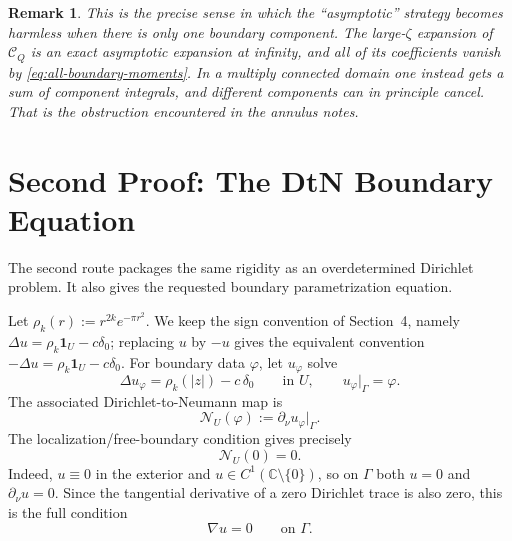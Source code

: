 \documentclass[11pt]{article}
\newtheorem{remark}[theorem]{Remark}
\newcommand{\C}{\mathbb C}
\newcommand{\1}{\mathbf 1}
\newcommand{\calC}{\mathcal C}
\newcommand{\calN}{\mathcal N}
\begin{document}
\begin{remark}
This is the precise sense in which the ``asymptotic'' strategy becomes harmless
when there is only one boundary component.  The large-\(\zeta\) expansion of
\(\calC_Q\) is an exact asymptotic expansion at infinity, and all of its
coefficients vanish by \eqref{eq:all-boundary-moments}.  In a multiply connected
domain one instead gets a sum of component integrals, and different components
can in principle cancel.  That is the obstruction encountered in the annulus
notes.
\end{remark}

\section{Second Proof: The DtN Boundary Equation}

The second route packages the same rigidity as an overdetermined Dirichlet
problem.  It also gives the requested boundary parametrization equation.

Let \(\rho_k(r):=r^{2k}e^{-\pi r^2}\).  We keep the sign convention of
Section~4, namely \(\Delta u=\rho_k\1_U-c\delta_0\); replacing \(u\) by
\(-u\) gives the equivalent convention \(-\Delta u=\rho_k\1_U-c\delta_0\).
For boundary data \(\varphi\), let \(u_\varphi\) solve
\[
  \Delta u_\varphi=\rho_k(|z|)-c\,\delta_0
  \qquad\text{in }U,
  \qquad
  u_\varphi|_{\Gamma}=\varphi .
\]
The associated Dirichlet-to-Neumann map is
\[
  \calN_U(\varphi):=\partial_\nu u_\varphi|_{\Gamma}.
\]
The localization/free-boundary condition gives precisely
\[
  \calN_U(0)=0.
\]
Indeed, \(u\equiv0\) in the exterior and \(u\in C^1(\C\setminus\{0\})\), so on
\(\Gamma\) both \(u=0\) and \(\partial_\nu u=0\).  Since the tangential derivative
of a zero Dirichlet trace is also zero, this is the full condition
\[
  \nabla u=0
  \qquad\text{on }\Gamma .
\]
\end{document}
